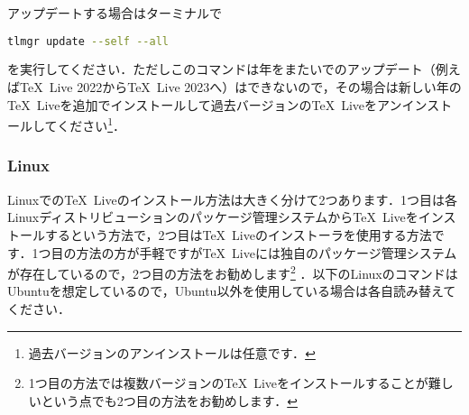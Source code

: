 アップデートする場合はターミナルで
\begin{lstlisting}[language=bash]
tlmgr update --self --all
\end{lstlisting}
を実行してください．ただしこのコマンドは年をまたいでのアップデート（例えば\TeX\ Live 2022から\TeX\ Live 2023へ）はできないので，その場合は新しい年の\TeX\ Liveを追加でインストールして過去バージョンの\TeX\ Liveをアンインストールしてください\footnote{過去バージョンのアンインストールは任意です．}．

\subsubsection*{Linux}
Linuxでの\TeX\ Liveのインストール方法は大きく分けて2つあります．1つ目は各Linuxディストリビューションのパッケージ管理システムから\TeX\ Liveをインストールするという方法で，2つ目は\TeX\ Liveのインストーラを使用する方法です．1つ目の方法の方が手軽ですが\TeX\ Liveには独自のパッケージ管理システムが存在しているので，2つ目の方法をお勧めします\footnote{1つ目の方法では複数バージョンの\TeX\ Liveをインストールすることが難しいという点でも2つ目の方法をお勧めします．}	．以下のLinuxのコマンドはUbuntuを想定しているので，Ubuntu以外を使用している場合は各自読み替えてください．

